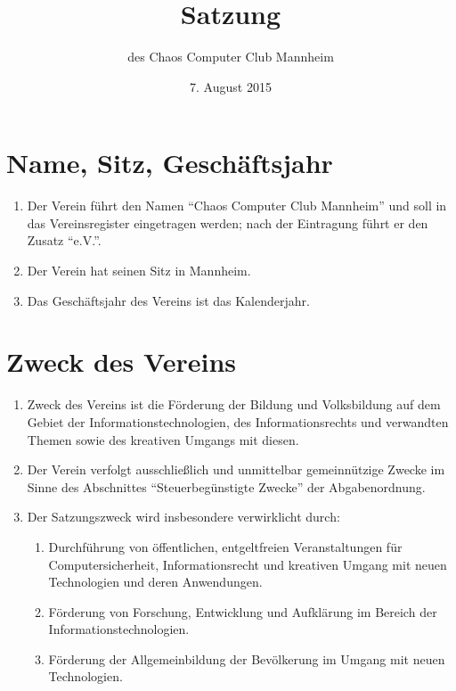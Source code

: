 \documentclass[a4paper, 12pt]{scrartcl}
\title{Satzung}
\subtitle{des Chaos Computer Club Mannheim}
\author{}
\date{7. August 2015}
\begin{document}
\maketitle
\sffamily
\tableofcontents

\newpage
\section{Name, Sitz, Geschäftsjahr}
\begin{enumerate}
	\item Der Verein führt den Namen "`Chaos Computer Club Mannheim"' und soll in das Vereinsregister eingetragen werden; nach der Eintragung führt er den Zusatz "`e.V."'.
	\item Der Verein hat seinen Sitz in Mannheim.
	\item Das Geschäftsjahr des Vereins ist das Kalenderjahr.
\end{enumerate}

\section{Zweck des Vereins}
\begin{enumerate}
	\item Zweck des Vereins ist die Förderung der Bildung und Volksbildung auf dem Gebiet der Informationstechnologien, des Informationsrechts und verwandten Themen sowie des kreativen Umgangs mit diesen.
	\item Der Verein verfolgt ausschließlich und unmittelbar gemeinnützige Zwecke im Sinne des Abschnittes "`Steuerbegünstigte Zwecke"' der Abgabenordnung.
	\item Der Satzungszweck wird insbesondere verwirklicht durch:
	\begin{enumerate}
		\item Durchführung von öffentlichen, entgeltfreien Veranstaltungen für Computersicherheit, Informationsrecht und kreativen Umgang mit neuen Technologien und deren Anwendungen.
		\item Förderung von Forschung, Entwicklung und Aufklärung im Bereich der Informationstechnologien.
		\item Förderung der Allgemeinbildung der Bevölkerung im Umgang mit neuen Technologien.
	\end{enumerate}
\end{enumerate}
\end{document}

